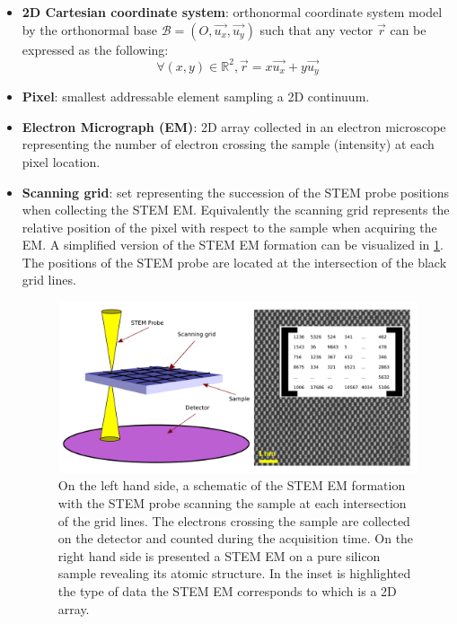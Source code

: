 \documentclass[12pt]{article}
\begin{document}
\begin{itemize}

\item \textbf{2D Cartesian coordinate system}: orthonormal coordinate system model by the orthonormal base $\mathcal{B}=(O,\vec{u_x},\vec{u_y})$ such that any vector $\vec{r}$ can be expressed as the following:
\begin{equation}
\forall (x,y) \in \mathbb{R}^{2}, \vec{r}=x\vec{u_x}+y\vec{u_y}
\end{equation}
\item \textbf{Pixel}: smallest addressable element sampling a 2D continuum.
\item \textbf{Electron Micrograph (EM)}: 2D array collected in an electron microscope 
representing the number of electron crossing the sample (intensity) at each 
pixel location.
\item \textbf{Scanning grid}: set representing the succession of the STEM probe positions when collecting the STEM EM. Equivalently the scanning grid represents the relative position of the pixel with respect to the sample when acquiring the EM. A simplified version of the 
STEM EM formation can be visualized in \cref{fig:STEM_imaging_Fig}. The positions of the STEM probe are located at the intersection of the black grid lines.
\begin{figure}[H]
\includegraphics[width=\linewidth]{Figures/STEM_imaging_Fig.png}
\caption{On the left hand side, a schematic of the STEM EM formation with the STEM probe scanning the sample at each intersection of the grid lines. The electrons crossing the sample are collected on the detector and counted during the acquisition time. On the right hand side is presented a STEM EM on a pure silicon sample revealing its atomic structure. In the inset is highlighted the type of data the STEM EM corresponds to which is a 2D array.}
\label{fig:STEM_imaging_Fig}
\end{figure}

\end{itemize}
\end{document}

